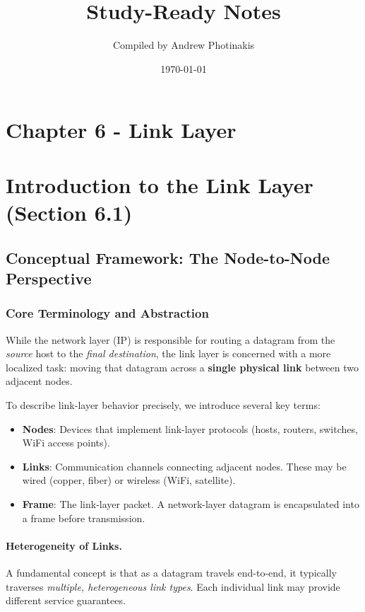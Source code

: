 \documentclass[12pt]{article}
\title{\TOPICTITLE\\\large Study-Ready Notes}
\author{Compiled by Andrew Photinakis}
\date{\today}
\begin{document}
\maketitle
\tableofcontents
\newpage

\section*{Chapter 6 - Link Layer}

\section{Introduction to the Link Layer (Section 6.1)}

\subsection{Conceptual Framework: The Node-to-Node Perspective}

\subsubsection{Core Terminology and Abstraction}

While the network layer (IP) is responsible for routing a datagram from the \emph{source} host to the \emph{final destination}, the link layer is concerned with a more localized task: moving that datagram across a \textbf{single physical link} between two adjacent nodes.

To describe link-layer behavior precisely, we introduce several key terms:

\begin{itemize}
    \item \textbf{Nodes}: Devices that implement link-layer protocols (hosts, routers, switches, WiFi access points).
    \item \textbf{Links}: Communication channels connecting adjacent nodes. These may be wired (copper, fiber) or wireless (WiFi, satellite).
    \item \textbf{Frame}: The link-layer packet. A network-layer datagram is encapsulated into a frame before transmission.
\end{itemize}

\paragraph{Heterogeneity of Links.}
A fundamental concept is that as a datagram travels end-to-end, it typically traverses \emph{multiple, heterogeneous link types}. Each individual link may provide different service guarantees.
\end{document}
